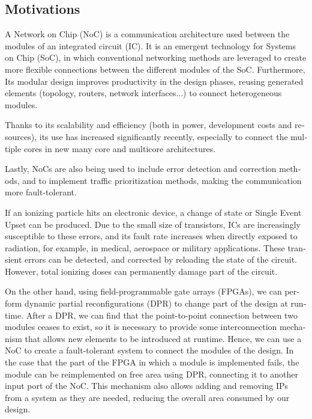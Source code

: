 \begin{otherlanguage}{english}
\addtocounter{chapter}{-1}
\chapter{Motivations}

A Network on Chip (NoC) is a communication architecture used between the modules of an integrated circuit (IC). It is an emergent technology for Systems on Chip (SoC), in which conventional networking methods are leveraged to create more flexible connections between the different modules of the SoC. Furthermore, Its modular design improves productivity in the design phases, reusing generated elements (topology, routers, network interfaces...) to connect heterogeneous modules. 

Thanks to its scalability and efficiency (both in power, development costs and resources), its use has increased significantly recently, especially to connect the multiple cores in new many core and multicore architectures.

Lastly, NoCs are also being used to include error detection and correction methods, and to implement traffic prioritization methods, making the communication more fault-tolerant.

If an ionizing particle hits an electronic device, a change of state or Single Event Upset can be produced. Due to the small size of transistors, ICs are increasingly susceptible to these errors, and its fault rate increases when directly exposed to radiation, for example, in medical, aerospace or military applications. These transient errors can be detected, and corrected by reloading the state of the circuit. However, total ionizing doses can permanently damage part of the circuit.

On the other hand, using field-programmable gate arrays (FPGAs), we can perform dynamic partial reconfigurations (DPR) to change part of the design at runtime. After a DPR, we can find that the point-to-point connection between two modules ceases to exist, so it is necessary to provide some interconnection mechanism that allows new elements to be introduced at runtime. Hence, we can use a NoC to create a fault-tolerant system to connect the modules of the design. In the case that the part of the FPGA in which a module is implemented fails, the module can be reimplemented on free area using DPR, connecting it to another input port of the NoC. This mechanism also allows adding and removing IPs from a system as they are needed, reducing the overall area consumed by our design.


\end{otherlanguage}
